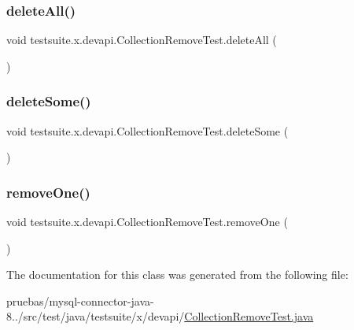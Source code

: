 \subsubsection{\texorpdfstring{delete\+All()}{deleteAll()}}
{\footnotesize\ttfamily void testsuite.\+x.\+devapi.\+Collection\+Remove\+Test.\+delete\+All (\begin{DoxyParamCaption}{ }\end{DoxyParamCaption})}

\mbox{\label{classtestsuite_1_1x_1_1devapi_1_1_collection_remove_test_a8fe87fd6558d6d9a1b380f1681357bcc}} 
\subsubsection{\texorpdfstring{delete\+Some()}{deleteSome()}}
{\footnotesize\ttfamily void testsuite.\+x.\+devapi.\+Collection\+Remove\+Test.\+delete\+Some (\begin{DoxyParamCaption}{ }\end{DoxyParamCaption})}

\mbox{\label{classtestsuite_1_1x_1_1devapi_1_1_collection_remove_test_abeedf7f001dc70e388e11e9bf7624331}} 
\subsubsection{\texorpdfstring{remove\+One()}{removeOne()}}
{\footnotesize\ttfamily void testsuite.\+x.\+devapi.\+Collection\+Remove\+Test.\+remove\+One (\begin{DoxyParamCaption}{ }\end{DoxyParamCaption})}



The documentation for this class was generated from the following file\+:\begin{DoxyCompactItemize}
\item 
pruebas/mysql-\/connector-\/java-\/8../src/test/java/testsuite/x/devapi/\mbox{\hyperlink{_collection_remove_test_8java}{Collection\+Remove\+Test.\+java}}\end{DoxyCompactItemize}
